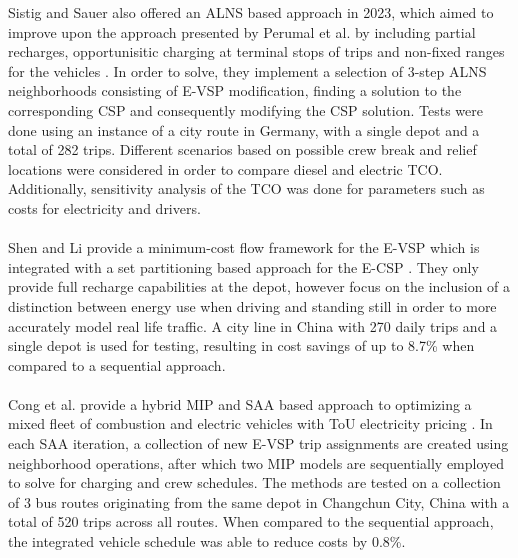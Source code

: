 \documentclass[]{article}
\begin{document}
Sistig and Sauer also offered an ALNS based approach in 2023, which aimed to
improve upon the approach presented by Perumal et al. by including partial
recharges, opportunisitic charging at terminal stops of trips and non-fixed
ranges for the vehicles \cite{Sistig2023}. In order to solve, they implement a
selection of 3-step ALNS neighborhoods consisting of E-VSP modification,
finding a solution to the corresponding CSP and consequently modifying the CSP
solution. Tests were done using an instance of a city route in Germany, with a
single depot and a total of 282 trips. Different scenarios based on possible crew break and relief
locations were considered in order to compare diesel and electric TCO.
Additionally, sensitivity analysis of the TCO was done for parameters such as costs for 
electricity and drivers. \\\\

Shen and Li provide a minimum-cost flow framework for the E-VSP which is
integrated with a set partitioning based approach for the E-CSP
\cite{Shen2023}. They only provide full recharge capabilities at the depot,
however focus on the inclusion of a distinction between energy use when driving and standing still
 in order to more accurately model real life traffic. A city
line in China with 270 daily trips and a single depot is used for testing, resulting in cost
savings of up to 8.7\% when compared to a sequential approach. \\\\

Cong et al. provide a hybrid MIP and SAA based approach to optimizing a mixed
fleet of combustion and electric vehicles with ToU electricity pricing
\cite{Cong2024}. In each SAA iteration, a collection of new E-VSP trip
assignments are created using neighborhood operations, after which two MIP
models are sequentially employed to solve for charging and crew schedules. The
methods are tested on a collection of 3 bus routes originating from the same
depot in Changchun City, China with a total of 520 trips across all routes.
When compared to the sequential approach, the integrated vehicle schedule was
able to reduce costs by 0.8\%. \\\\
\end{document}
